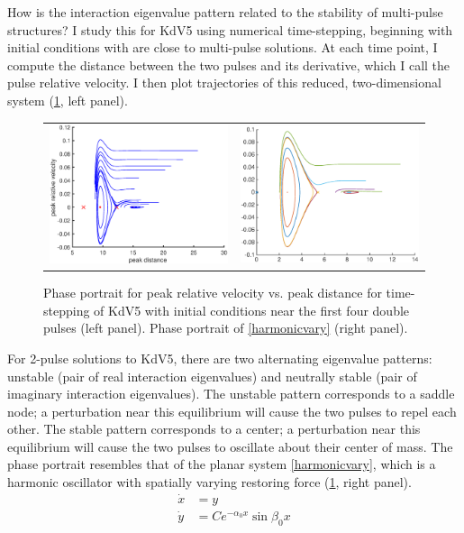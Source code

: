 \documentclass[12pt,reqno,oneside]{amsart}
\theoremstyle{definition}
\theoremstyle{remark}
\begin{document}
How is the interaction eigenvalue pattern related to the stability of multi-pulse structures? I study this for KdV5 using numerical time-stepping, beginning with initial conditions with are close to multi-pulse solutions. At each time point, I compute the distance between the two pulses and its derivative, which I call the pulse relative velocity. I then plot trajectories of this reduced, two-dimensional system (\cref{fig:KdV5timestep}, left panel). 
\begin{figure}[H]
\begin{tabular}{cc}
\includegraphics[width=8cm]{images/phaseportrait}  &
\includegraphics[width=8cm]{images/simplephaseportrait}
\end{tabular}
\caption{Phase portrait for peak relative velocity vs. peak distance for time-stepping of KdV5 with initial conditions near the first four double pulses (left panel). Phase portrait of \cref{harmonicvary} (right panel).
}
\label{fig:KdV5timestep}
\end{figure}
For 2-pulse solutions to KdV5, there are two alternating eigenvalue patterns: unstable (pair of real interaction eigenvalues) and neutrally stable (pair of imaginary interaction eigenvalues). The unstable pattern corresponds to a saddle node; a perturbation near this equilibrium will cause the two pulses to repel each other. The stable pattern corresponds to a center; a perturbation near this equilibrium will cause the two pulses to oscillate about their center of mass. The phase portrait resembles that of the planar system \eqref{harmonicvary}, which is a harmonic oscillator with spatially varying restoring force (\cref{fig:KdV5timestep}, right panel).
\begin{equation}\label{harmonicvary}
\begin{aligned}
\dot{x} &= y \\
\dot{y} &= C e^{-\alpha_0 x} \sin \beta_0 x
\end{aligned}
\end{equation}





\end{document}
